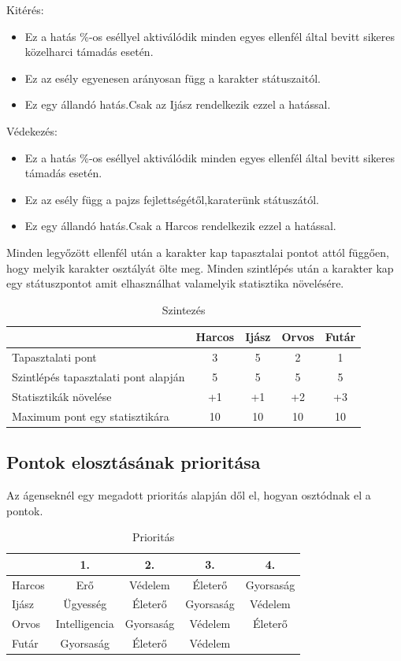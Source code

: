 Kitérés:
\begin{itemize}
\item Ez a hatás \%-os eséllyel aktiválódik minden egyes ellenfél által bevitt sikeres közelharci támadás esetén.
\item Ez az esély egyenesen arányosan függ a karakter státuszaitól.
\item Ez egy állandó hatás.Csak az Ijász rendelkezik ezzel a hatással.
\end{itemize}

Védekezés:
\begin{itemize}
\item Ez a hatás \%-os eséllyel aktiválódik minden egyes ellenfél által bevitt sikeres támadás esetén.
\item Ez az esély függ a pajzs fejlettségétől,karaterünk státuszától.
\item Ez egy állandó hatás.Csak a Harcos rendelkezik ezzel a hatással.
\end{itemize}


Minden legyőzött ellenfél után a karakter kap tapasztalai pontot attól függően, hogy melyik karakter osztályát ölte meg.
Minden szintlépés után a karakter kap egy státuszpontot amit elhasználhat valamelyik statisztika növelésére.

\begin{table}[!ht]
\centering
\caption{Szintezés}
\label{tab:table2}
\begin{tabular}{|l|c|c|c|c|}
\hline
 & Harcos & Ijász & Orvos & Futár \\
\hline
Tapasztalati pont & 3 & 5 & 2 & 1   \\
\hline
Szintlépés tapasztalati pont alapján & 5 & 5 & 5 & 5  \\
\hline
Statisztikák növelése & +1 & +1 & +2 & +3 \\
\hline
Maximum pont egy statisztikára & 10 & 10 & 10 & 10  \\
\hline
\end{tabular}
\end{table}

\subsection{Pontok elosztásának prioritása}

Az ágenseknél egy megadott prioritás alapján dől el, hogyan osztódnak el a pontok.

\begin{table}[!ht]
\centering
\caption{Prioritás}
\label{tab:table3}
\begin{tabular}{|l|c|c|c|c|}
\hline
 & 1. & 2. & 3. & 4. \\
\hline
Harcos & Erő & Védelem & Életerő & Gyorsaság   \\
\hline
Ijász & Ügyesség & Életerő & Gyorsaság & Védelem  \\
\hline
Orvos & Intelligencia & Gyorsaság & Védelem & Életerő \\
\hline
Futár & Gyorsaság & Életerő & Védelem &  \\
\hline
\end{tabular}
\end{table}

